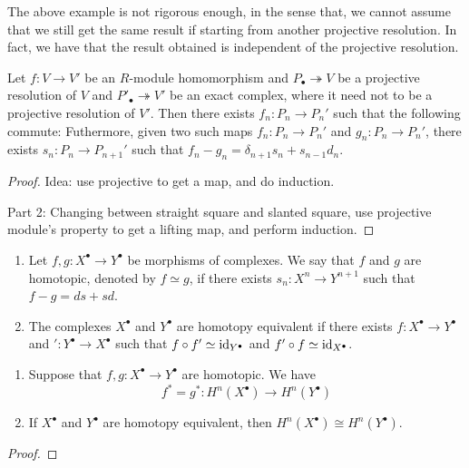 \medskip

\begin{re}
    The above example is not rigorous enough, in the sense that, we cannot assume that we still get the same result if starting from another projective resolution. In fact, we have that the result obtained is independent of the projective resolution.
\end{re}

\medskip

\begin{pro} 
    Let $f:V\to V'$ be an $R$-module homomorphism and $P_\bullet\twoheadrightarrow V$ be a projective resolution of $V$ and $P'_\bullet \twoheadrightarrow V'$ be an exact complex, where it need not to be a projective resolution of $V'$. Then there exists $f_n:P_n\to P_n'$ such that the following commute:
    Futhermore, given two such maps $f_n:P_n \to P_n'$ and $g_n:P_n\to P_n'$, there exists $s_n:P_n \to P_{n+1}'$ such that $f_n-g_n=\delta_{n+1}s_n + s_{n-1}d_n$.
\end{pro}
\begin{proof}
    Idea: use projective to get a map, and do induction.

    Part 2: Changing between straight square and slanted square, use projective module's property to get a lifting map, and perform induction.

\end{proof}

\begin{defn}
    \hfill

    \begin{enumerate}
        \item Let $f,g: X^\bullet \to Y^\bullet$ be morphisms of complexes. We say that $f$ and $g$ are homotopic, denoted by $f\simeq g$, if there exists $s_n: X^n \to Y^{n+1}$ such that $f-g = ds + sd$.
        \item The complexes $X^\bullet$ and $Y^\bullet$ are homotopy equivalent if there exists $f:X^\bullet \to Y^\bullet$ and $':Y^\bullet \to X^\bullet$ such that $f\circ f' \simeq \operatorname{id}_{Y^\bullet}$ and $f'\circ f \simeq \operatorname{id}_{X^\bullet}$. 
    \end{enumerate}
\end{defn}

\medskip

\begin{pro}
    \hfill

    \begin{enumerate}
        \item Suppose that $f,g:X^\bullet \to Y^\bullet$ are homotopic. We have 
        \[f^* = g^* : H^n (X^\bullet) \to H^n(Y^\bullet)\]
        \item If $X^\bullet$ and $Y^\bullet$ are homotopy equivalent, then $H^n(X^\bullet)\cong H^n(Y^\bullet)$.
    \end{enumerate}
\end{pro}
\begin{proof}

\end{proof}

